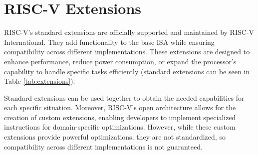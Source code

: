 \section{RISC-V Extensions}
\label{sec:riscv_extensions}

RISC-V’s standard extensions are officially supported and maintained by RISC-V
International. They add functionality to the base ISA while ensuring compatibility
across different implementations. These extensions are designed to enhance
performance, reduce power consumption, or expand the processor's capability to
handle specific tasks efficiently (standard extensions can be seen in Table \ref{tab:extensions}).

Standard extensions can be used together to obtain the needed capabilities for
each specific situation. Moreover, RISC-V’s open architecture allows for the
creation of custom extensions, enabling developers to implement specialized instructions
for domain-specific optimizations. However, while these custom extensions provide
powerful optimizations, they are not standardized, so compatibility across different
implementations is not guaranteed.

